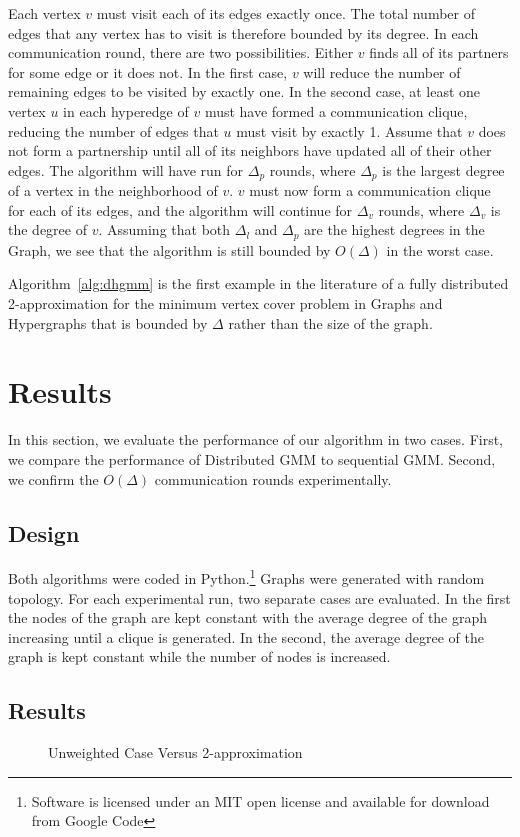 Each vertex $v$ must visit each of its edges exactly once. The total number of edges that any vertex has to visit is therefore bounded by its degree. In each communication round, there are two possibilities. Either $v$ finds all of its partners for some edge or it does not. In the first case, $v$ will reduce the number of remaining edges to be visited by exactly one. In the second case, at least one vertex $u$ in each hyperedge of $v$ must have formed a communication clique, reducing the number of edges that $u$ must visit by exactly 1. Assume that $v$ does not form a partnership until all of its neighbors have updated all of their other edges. The algorithm will have run for $\Delta_p$ rounds, where $\Delta_p$ is the largest degree of a vertex in the neighborhood of $v$. $v$ must now form a communication clique for each of its edges, and the algorithm will continue for $\Delta_v$ rounds, where $\Delta_v$ is the degree of $v$. Assuming that both $\Delta_l$ and $\Delta_p$ are the highest degrees in the Graph, we see that the algorithm is still bounded by $O(\Delta)$ in the worst case.

Algorithm~\ref{alg:dhgmm} is the first example in the literature of a fully distributed 2-approximation for the minimum vertex cover problem in Graphs and Hypergraphs that is bounded by $\Delta$ rather than the size of the graph.\cite{1435381}

\section{Results} 
In this section, we evaluate the performance of our algorithm in two cases. First, we compare the performance of Distributed GMM to sequential GMM. Second, we confirm the $O(\Delta)$ communication rounds experimentally. 
\subsection{Design}
Both algorithms were coded in Python.\footnote{Software is licensed under an MIT open license and available for download from Google Code} Graphs were generated with random topology. For each experimental run, two separate cases are evaluated. In the first the nodes of the graph are kept constant with the average degree of the graph increasing until a clique is generated. In the second, the average degree of the graph is kept constant while the number of nodes is increased.
\subsection{Results}
\begin{center}
\begin{figure}[width=2in]
  \label{fig:unweight_covers}
  \caption{Unweighted Case Versus 2-approximation}
  
\end{figure}	
\end{center}


